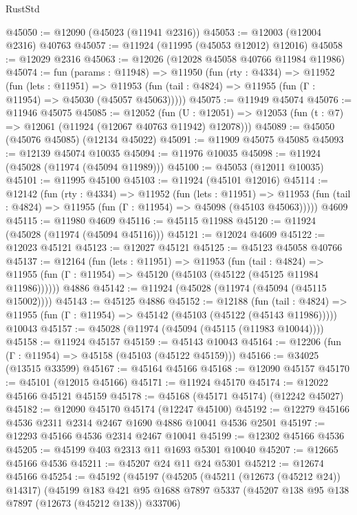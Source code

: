\begin{lexlean}{RustStd}
\begin{coremodule}
{\begin{coremodule}
{{{{{{{{{{{{{{{{{{{{{{{{{{{{{{{{{{{{{{{{{{{{{{{{{{{{{{{{{{{{{{{{{{{{{{{{{{{{{{{{@45050 := @12090 (@45023 (@11941 @2316))
@45053 := @12003 (@12004 @2316) @40763
@45057 := @11924 (@11995 (@45053 @12012) @12016)
@45058 := @12029 @2316
@45063 := @12026 (@12028 @45058 @40766 @11984 @11986)
@45074 := fun (params : @11948) =>
  @11950
    (fun (rty : @4334) =>
    @11952
      (fun (lets : @11951) =>
      @11953 (fun (tail : @4824) => @11955 (fun (Γ : @11954) => @45030 (@45057 @45063)))))
@45075 := @11949 @45074
@45076 := @11946 @45075
@45085 := @12052
    (fun (U : @12051) => @12053 (fun (t : @7) => @12061 (@11924 (@12067 @40763 @11942) @12078)))
@45089 := @45050 (@45076 @45085) (@12134 @45022)
@45091 := @11909 @45075 @45085
@45093 := @12139 @45074 @10035
@45094 := @11976 @10035
@45098 := @11924 (@45028 (@11974 (@45094 @11989)))
@45100 := @45053 (@12011 @10035)
@45101 := @11995 @45100
@45103 := @11924 (@45101 @12016)
@45114 := @12142
    (fun (rty : @4334) =>
    @11952
      (fun (lets : @11951) =>
      @11953 (fun (tail : @4824) => @11955 (fun (Γ : @11954) => @45098 (@45103 @45063)))))
    @4609
@45115 := @11980 @4609
@45116 := @45115 @11988
@45120 := @11924 (@45028 (@11974 (@45094 @45116)))
@45121 := @12024 @4609
@45122 := @12023 @45121
@45123 := @12027 @45121
@45125 := @45123 @45058 @40766
@45137 := @12164
    (fun (lets : @11951) =>
    @11953
      (fun (tail : @4824) =>
      @11955 (fun (Γ : @11954) => @45120 (@45103 (@45122 (@45125 @11984 @11986))))))
    @4886
@45142 := @11924 (@45028 (@11974 (@45094 (@45115 @15002))))
@45143 := @45125 @4886
@45152 := @12188
    (fun (tail : @4824) => @11955 (fun (Γ : @11954) => @45142 (@45103 (@45122 (@45143 @11986)))))
    @10043
@45157 := @45028 (@11974 (@45094 (@45115 (@11983 @10044))))
@45158 := @11924 @45157
@45159 := @45143 @10043
@45164 := @12206 (fun (Γ : @11954) => @45158 (@45103 (@45122 @45159)))
@45166 := @34025 (@13515 @33599)
@45167 := @45164 @45166
@45168 := @12090 @45157
@45170 := @45101 (@12015 @45166)
@45171 := @11924 @45170
@45174 := @12022 @45166 @45121 @45159
@45178 := @45168 (@45171 @45174) (@12242 @45027)
@45182 := @12090 @45170 @45174 (@12247 @45100)
@45192 := @12279 @45166 @4536 @2311 @2314 @2467 @1690 @4886 @10041 @4536 @2501
@45197 := @12293 @45166 @4536 @2314 @2467 @10041
@45199 := @12302 @45166 @4536
@45205 := @45199 @403 @2313 @11 @1693 @5301 @10040
@45207 := @12665 @45166 @4536
@45211 := @45207 @24 @11 @24 @5301
@45212 := @12674 @45166
@45254 := @45192
    (@45197
      (@45205
        (@45211 (@12673 (@45212 @24)) @14317)
        (@45199
          @183
          @421
          @95
          @1688
          @7897
          @5337
          (@45207 @138 @95 @138 @7897 (@12673 (@45212 @138)) @33706)
}}}}}}}}}}}}}}}}}}}}}}}}}}}}}}}}}}}}}}}}}}}}}}}}}}}}}}}}}}}}}}}}}}}}}}}}}}}}}}}}
\end{coremodule}}
\end{coremodule}
\end{lexlean}
